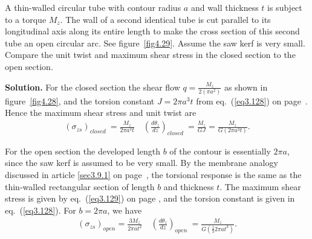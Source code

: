 \documentclass{AeroStructure-ERJohnson}
\begin{document}
\begin{example}\label{ex4.9}\setcounter{equation}{0}\def\theequation{\alph{equation}}%
A thin-walled circular tube with contour radius $a$ and wall thickness $t$ is subject to a torque $M_{z}$. The wall of a second identical tube is cut parallel to its longitudinal axis along its entire length to make the cross section of this second tube an open circular arc. See figure~\ref{fig4.29}. Assume the saw kerf is very small. Compare the unit twist and maximum shear stress in the closed section to the open section.

{\def\thefigure{4.29}
}


\noindent\textbf{Solution.}\enspace
For the closed section the shear flow $q=\frac{M_{z}}{2\left(\pi a^{2}\right)}$ as shown in figure~\ref{fig4.28}, and the torsion constant $J=2 \pi a^{3} t$ from eq.~(\ref{eq3.128}) on page~\pageref{eq3.128}. Hence the maximum shear stress and unit twist are
\begin{align}\label{ex4.9a}
\left(\sigma_{z s}\right)_{\textit{closed }}=\frac{M_{z}}{2 \pi a^{2} t} \quad\left(\frac{d \theta_{z}}{d z}\right)_{\textit{closed }}=\frac{M_{z}}{G J}=\frac{M_{z}}{G\left(2 \pi a^{3} t\right)}.
\end{align}

\removelastskip

For the open section the developed length $b$ of the contour is essentially $2 \pi a$, since the saw kerf is assumed to be very small. By the membrane analogy discussed in article \ref{sec3.9.1} on page~\pageref{sec3.9.1}, the torsional response is the same as the thin-walled rectangular section of length $b$ and thickness $t$. The maximum shear stress is given by eq.~(\ref{eq3.129}) on page \pageref{eq3.129}, and the torsion constant is given in eq.~(\ref{eq3.128}). For $b=2 \pi a$, we have
\begin{align}\label{ex4.9b}
\left(\sigma_{z s}\right)_{\textit{open}}=\frac{3 M_{z}}{2 \pi a t^{2}} \quad\left(\frac{d \theta_{z}}{d z}\right)_{\textit{open }}=\frac{M_{z}}{G\left(\frac{1}{3} 2 \pi a t^{3}\right)}.
\end{align}


\end{example}
\end{document}
